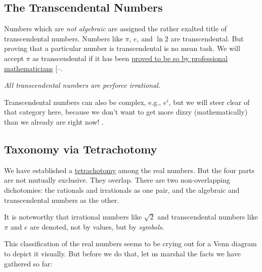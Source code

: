 \documentclass[
  a4paper,
]{article}
\begin{document}
\subsection{The Transcendental
Numbers}\label{the-transcendental-numbers}

Numbers which are \emph{not algebraic} are assigned the rather exalted
title of transcendental numbers. Numbers like
\href{https://www.wolframalpha.com/input?i=is+pi+transcendental}{\(\pi\)},
\href{https://www.wolframalpha.com/input?i=is+e+transcendental}{\(e\)},
and
\href{https://www.wolframalpha.com/input?i=is+ln\%282\%29+transcendental}{\(\ln 2\)}
are transcendental. But proving that a particular number is
transcendental is no mean task. We will accept \(\pi\) as transcendental
if it has been
\href{https://fermatslibrary.com/s/the-transcendence-of-pi}{proved to be
so by professional mathematicians}
{[}--\citeproc{ref-morris-jones-pearson-2022}{10}{]}.

\emph{All transcendental numbers are perforce irrational}.

Transcendental numbers can also be complex, e.g., \(e^{i}\), but we will
steer clear of that category here, because we don't want to get more
dizzy (mathematically) than we already are right now! 
\normalfont.

\subsection{Taxonomy via Tetrachotomy}\label{taxonomy-via-tetrachotomy}

We have established a
\href{https://www.collinsdictionary.com/dictionary/english/tetrachotomy}{tetrachotomy}
among the real numbers. But the four parts are not mutually exclusive.
They overlap. There are two non-overlapping dichotomies: the rationals
and irrationals as one pair, and the algebraic and transcendental
numbers as the other.

It is noteworthy that irrational numbers like \(\sqrt{2}\) and
transcendental numbers like \(\pi\) and \(e\) are denoted, not by
values, but by \emph{symbols}.

This classification of the real numbers seems to be crying out for a
Venn diagram to depict it visually. But before we do that, let us
marshal the facts we have gathered so far:
\end{document}
